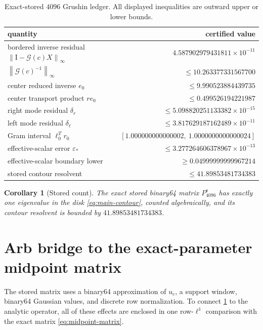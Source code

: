 \documentclass[11pt]{article}
\newtheorem{corollary}[theorem]{Corollary}
\theoremstyle{definition}
\theoremstyle{remark}
\newcommand{\Id}{\mathrm I}
\newcommand{\cG}{\mathcal G}
\newcommand{\uc}{u_{\mathrm c}}
\newcommand{\norm}[1]{\left\lVert #1\right\rVert}
\begin{document}
\begin{table}[H]
\centering
\caption{Exact-stored $4096$ Grushin ledger.  All displayed inequalities are
outward upper or lower bounds.}
\label{tab:grushin}
\begin{tabular}{@{}lr@{}}
\toprule
quantity & certified value\\
\midrule
bordered inverse residual $\norm{\Id-\cG(c)X}_\infty$
  & $4.587902979431811\times10^{-11}$\\
$\norm{\cG(c)^{-1}}_\infty$
  & $\le10.263377331567700$\\
center reduced inverse $e_0$
  & $\le9.990523884439735$\\
center transport product $re_0$
  & $\le0.499526194221987$\\
right mode residual $\delta_r$
  & $\le5.098820251133382\times10^{-15}$\\
left mode residual $\delta_\ell$
  & $\le3.817629187162489\times10^{-11}$\\
Gram interval $\ell_0^Tr_0$
  & $[1.000000000000002,\ 1.0000000000000024]$\\
effective-scalar error $\varepsilon_*$
  & $\le3.277264606378967\times10^{-13}$\\
effective-scalar boundary lower
  & $\ge0.04999999999967214$\\
stored contour resolvent
  & $\le41.89853481734383$\\
\bottomrule
\end{tabular}
\end{table}

\begin{corollary}[Stored count]
\label{cor:stored}
The exact stored binary64 matrix $P^{\mathrm s}_{4096}$ has exactly one
eigenvalue in the disk \eqref{eq:main-contour}, counted algebraically, and
its contour resolvent is bounded by $41.89853481734383$.
\end{corollary}

\section{Arb bridge to the exact-parameter midpoint matrix}
\label{sec:arb-bridge}

The stored matrix uses a binary64 approximation of $\uc$, a support window,
binary64 Gaussian values, and discrete row normalization.  To connect
\cref{cor:stored} to the analytic operator, all of these effects are enclosed
in one row-$\ell^1$ comparison with the exact matrix
\eqref{eq:midpoint-matrix}.
\end{document}
